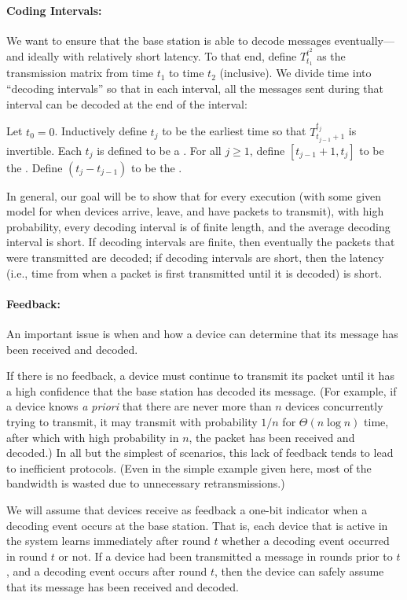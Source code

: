 \paragraph{Coding Intervals:} We want to ensure that the base station is able to decode messages eventually---and ideally with relatively short latency.  To that end, define $T_{t_1}^{t^2}$ as the transmission matrix from time $t_1$ to time $t_2$ (inclusive).  We divide time into ``decoding intervals'' so that in each interval, all the messages sent during that interval can be decoded at the end of the interval:
\begin{definition}
Let $t_0 = 0$.  Inductively define $t_j$ to be the earliest time so that $T_{t_{j-1}+1}^{t_j}$ is invertible.  Each $t_j$ is defined to be a .  For all $j \geq 1$, define $[t_{j-1}+1, t_{j}]$ to be the .  Define $(t_j - t_{j-1})$ to be the .
\end{definition}
In general, our goal will be to show that for every execution (with some given model for when devices arrive, leave, and have packets to transmit), with high probability, every decoding interval is of finite length, and the average decoding interval is short.  If decoding intervals are finite, then eventually the packets that were transmitted are decoded; if decoding intervals are short, then the latency (i.e., time from when a packet is first transmitted until it is decoded) is short.  

\paragraph{Feedback:} An important issue is when and how a device can determine that its message has been received and decoded.  

If there is no feedback, a device must continue to transmit its packet until it has a high confidence that the base station has decoded its message.  (For example, if a device knows \emph{a priori} that there are never more than $n$ devices concurrently trying to transmit, it may transmit with probability $1/n$ for $\Theta(n \log{n})$ time, after which with high probability in $n$, the packet has been received and decoded.)  In all but the simplest of scenarios, this lack of feedback tends to lead to  inefficient protocols.  (Even in the simple example given here, most of the bandwidth is wasted due to unnecessary retransmissions.)

We will assume that devices receive as feedback a one-bit indicator when a decoding event occurs at the base station.  That is, each device that is active in the system learns immediately after round $t$ whether a decoding event occurred in round $t$ or not.  If a device had been transmitted a message in rounds prior to $t$, and a decoding event occurs after round $t$, then the device can safely assume that its message has been received and decoded.

